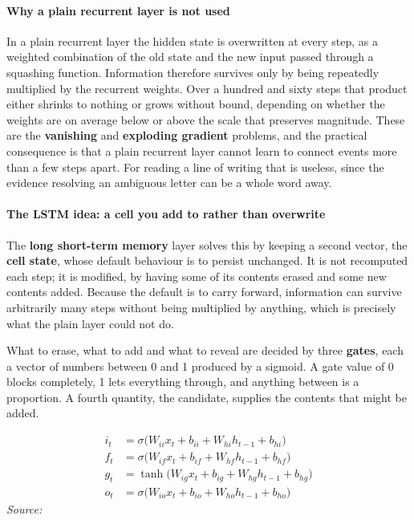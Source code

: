 \paragraph{Why a plain recurrent layer is not used}
In a plain recurrent layer the hidden state is overwritten at every step, as a weighted combination of the old state and the new input passed through a squashing function. Information therefore survives only by being repeatedly multiplied by the recurrent weights. Over a hundred and sixty steps that product either shrinks to nothing or grows without bound, depending on whether the weights are on average below or above the scale that preserves magnitude. These are the \textbf{vanishing} and \textbf{exploding gradient} problems, and the practical consequence is that a plain recurrent layer cannot learn to connect events more than a few steps apart. For reading a line of writing that is useless, since the evidence resolving an ambiguous letter can be a whole word away.


\paragraph{The LSTM idea: a cell you add to rather than overwrite}
The \textbf{long short-term memory} layer \cite{hochreiter1997} solves this by keeping a second vector, the \textbf{cell state}, whose default behaviour is to persist unchanged. It is not recomputed each step; it is modified, by having some of its contents erased and some new contents added. Because the default is to carry forward, information can survive arbitrarily many steps without being multiplied by anything, which is precisely what the plain layer could not do.

What to erase, what to add and what to reveal are decided by three \textbf{gates}, each a vector of numbers between 0 and 1 produced by a sigmoid. A gate value of 0 blocks completely, 1 lets everything through, and anything between is a proportion. A fourth quantity, the candidate, supplies the contents that might be added.


\begin{equation}
\begin{aligned}i_t &= \sigma\big(W_{ii} x_t + b_{ii} + W_{hi} h_{t-1} + b_{hi}\big) \\[2pt]f_t &= \sigma\big(W_{if} x_t + b_{if} + W_{hf} h_{t-1} + b_{hf}\big) \\[2pt]g_t &= \tanh\big(W_{ig} x_t + b_{ig} + W_{hg} h_{t-1} + b_{hg}\big) \\[2pt]o_t &= \sigma\big(W_{io} x_t + b_{io} + W_{ho} h_{t-1} + b_{ho}\big)\end{aligned}
\end{equation}
\noindent\emph{Source: }\cite{hochreiter1997}


